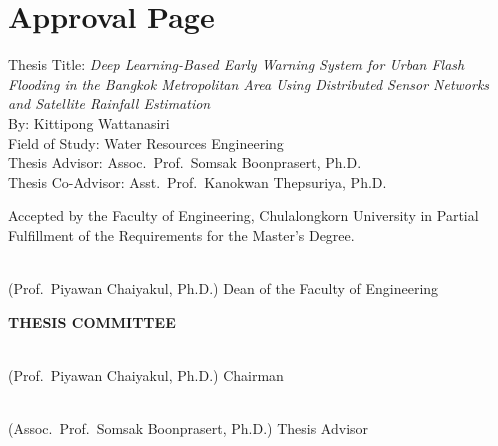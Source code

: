 \chapter*{Approval Page}

\noindent
Thesis Title: \textit{Deep Learning-Based Early Warning System for Urban Flash Flooding in the Bangkok Metropolitan Area Using Distributed Sensor Networks and Satellite Rainfall Estimation}\\[4pt]
By: Kittipong Wattanasiri\\[4pt]
Field of Study: Water Resources Engineering\\[4pt]
Thesis Advisor: Assoc.\ Prof.\ Somsak Boonprasert, Ph.D.\\[4pt]
Thesis Co-Advisor: Asst.\ Prof.\ Kanokwan Thepsuriya, Ph.D.

\vspace{0.4cm}
\noindent
Accepted by the Faculty of Engineering, Chulalongkorn University in Partial Fulfillment of the Requirements for the Master's Degree.

\vspace{0.8cm}
\noindent
\begin{minipage}{\textwidth}
\hspace{2cm}\hrulefill\\
\hspace{2cm} (Prof.\ Piyawan Chaiyakul, Ph.D.) \hfill Dean of the Faculty of Engineering
\end{minipage}
\par
\vspace{1.0cm}

\noindent\textbf{THESIS COMMITTEE}

\vspace{0.6cm}
\noindent
\begin{minipage}{\textwidth}
\hspace{2cm}\hrulefill\\
\hspace{2cm} (Prof.\ Piyawan Chaiyakul, Ph.D.) \hfill Chairman
\end{minipage}
\par
\vspace{0.8cm}

\noindent
\begin{minipage}{\textwidth}
\hspace{2cm}\hrulefill\\
\hspace{2cm} (Assoc.\ Prof.\ Somsak Boonprasert, Ph.D.) \hfill Thesis Advisor
\end{minipage}
\par
\vspace{0.8cm}

